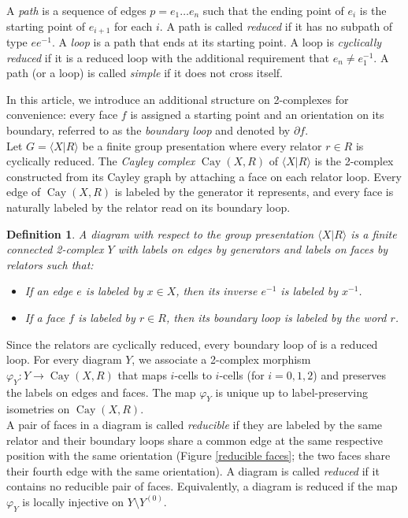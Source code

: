 \documentclass[a4paper]{article}
\DeclareMathOperator{\Cay}{Cay}
\newcommand{\moinsun}{^{-1}}
\newcommand\Pres[2]{\langle #1 | #2 \rangle}
\newtheorem{defi}[thm]{Definition}
\theoremstyle{remark}
\begin{document}
A \textit{path} is a sequence of edges $p = e_1\dots e_n$ such that the ending point of $e_i$ is the starting point of $e_{i+1}$ for each $i$. A path is called \textit{reduced} if it has no subpath of type $ee\moinsun$. A \textit{loop} is a path that ends at its starting point. A loop is \textit{cyclically reduced} if it is a reduced loop with the additional requirement that $e_n\neq e_1\moinsun$. A path (or a loop) is called \textit{simple} if it does not cross itself.

In this article, we introduce an additional structure on 2-complexes for convenience: every face $f$ is assigned a starting point and an orientation on its boundary, referred to as the \textit{boundary loop} and denoted by $\partial f$.\\

Let $G = \Pres{X}{R}$ be a finite group presentation where every relator $r\in R$ is cyclically reduced. The \textit{Cayley complex} $\Cay(X,R)$ of $\Pres{X}{R}$ is the 2-complex constructed from its Cayley graph by attaching a face on each relator loop. Every edge of $\Cay(X,R)$ is labeled by the generator it represents, and every face is naturally labeled by the relator read on its boundary loop.

\begin{defi}
    A \textup{diagram} with respect to the group presentation $\Pres{X}{R}$ is a finite connected 2-complex $Y$ with labels on edges by generators and labels on faces by relators such that:
    \begin{itemize}
        \item If an edge $e$ is labeled by $x\in X$, then its inverse $e\moinsun$ is labeled by $x\moinsun$.
        \item If a face $f$ is labeled by $r\in R$, then its boundary loop is labeled by the word $r$.
    \end{itemize}
\end{defi}

Since the relators are cyclically reduced, every boundary loop of is a reduced loop. For every diagram $Y$, we associate a 2-complex morphism $\varphi_Y : Y\to \Cay(X,R)$ that maps $i$-cells to $i$-cells (for $i = 0,1,2$) and preserves the labels on edges and faces. The map $\varphi_Y$ is unique up to label-preserving isometries on $\Cay(X,R)$.\\

A pair of faces in a diagram is called \textit{reducible} if they are labeled by the same relator and their boundary loops share a common edge at the same respective position with the same orientation (Figure \ref{reducible faces}; the two faces share their fourth edge with the same orientation). A diagram is called \textit{reduced} if it contains no reducible pair of faces. Equivalently, a diagram is reduced if the map $\varphi_Y$ is locally injective on $Y\setminus Y^{(0)}$.
\end{document}
